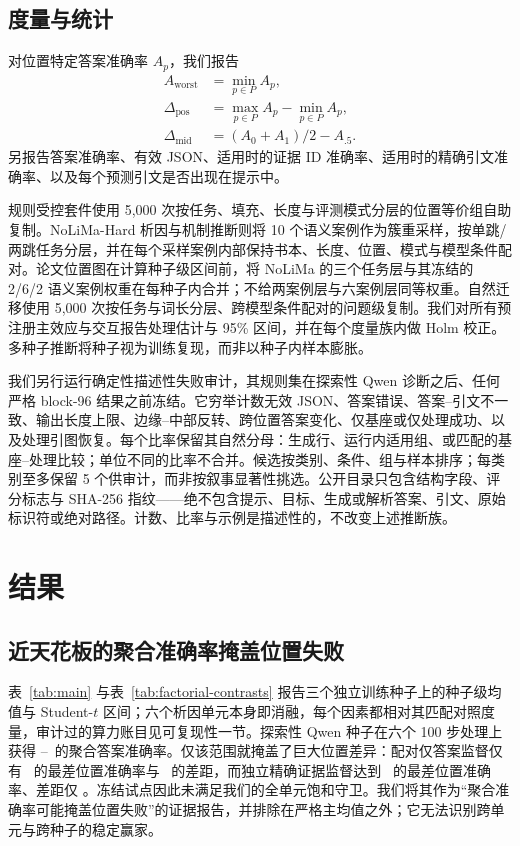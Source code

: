 \documentclass[11pt]{article}
\begin{document}
\subsection{度量与统计}
\label{sec:metrics}

对位置特定答案准确率 $A_p$，我们报告
\begin{align*}
A_{\mathrm{worst}} &= \min_{p\in P} A_p,\\
\Delta_{\mathrm{pos}} &= \max_{p\in P}A_p-\min_{p\in P}A_p,\\
\Delta_{\mathrm{mid}} &= (A_{0}+A_{1})/2-A_{.5}.
\end{align*}
另报告答案准确率、有效 JSON、适用时的证据 ID 准确率、适用时的精确引文准确率、以及每个预测引文是否出现在提示中。

规则受控套件使用 5,000 次按任务、填充、长度与评测模式分层的位置等价组自助复制。NoLiMa-Hard 析因与机制推断则将 10 个语义案例作为簇重采样，按单跳/两跳任务分层，并在每个采样案例内部保持书本、长度、位置、模式与模型条件配对。论文位置图在计算种子级区间前，将 NoLiMa 的三个任务层与其冻结的 2/6/2 语义案例权重在每种子内合并；不给两案例层与六案例层同等权重。自然迁移使用 5,000 次按任务与词长分层、跨模型条件配对的问题级复制。我们对所有预注册主效应与交互报告处理估计与 95\% 区间，并在每个度量族内做 Holm 校正。多种子推断将种子视为训练复现，而非以种子内样本膨胀。

我们另行运行确定性描述性失败审计，其规则集在探索性 Qwen 诊断之后、任何严格 block-96 结果之前冻结。它穷举计数无效 JSON、答案错误、答案--引文不一致、输出长度上限、边缘--中部反转、跨位置答案变化、仅基座或仅处理成功、以及处理引图恢复。每个比率保留其自然分母：生成行、运行内适用组、或匹配的基座--处理比较；单位不同的比率不合并。候选按类别、条件、组与样本排序；每类别至多保留 5 个供审计，而非按叙事显著性挑选。公开目录只包含结构字段、评分标志与 SHA-256 指纹——绝不包含提示、目标、生成或解析答案、引文、原始标识符或绝对路径。计数、比率与示例是描述性的，不改变上述推断族。

\section{结果}

\subsection{近天花板的聚合准确率掩盖位置失败}

表~\ref{tab:main} 与表~\ref{tab:factorial-contrasts} 报告三个独立训练种子上的种子级均值与 Student-$t$ 区间；六个析因单元本身即消融，每个因素都相对其匹配对照度量，审计过的算力账目见可复现性一节。探索性 Qwen 种子在六个 100 步处理上获得 \ExploratoryRuleAnswerMin--\ExploratoryRuleAnswerMax\ 的聚合答案准确率。仅该范围就掩盖了巨大位置差异：配对仅答案监督仅有 \ExploratoryPairedAnswerWorst\ 的最差位置准确率与 \ExploratoryPairedAnswerGap\ 的差距，而独立精确证据监督达到 \ExploratoryIndependentEvidenceWorst\ 的最差位置准确率、差距仅 \ExploratoryIndependentEvidenceGap。冻结试点因此未满足我们的全单元饱和守卫。我们将其作为``聚合准确率可能掩盖位置失败''的证据报告，并排除在严格主均值之外；它无法识别跨单元与跨种子的稳定赢家。
\end{document}
